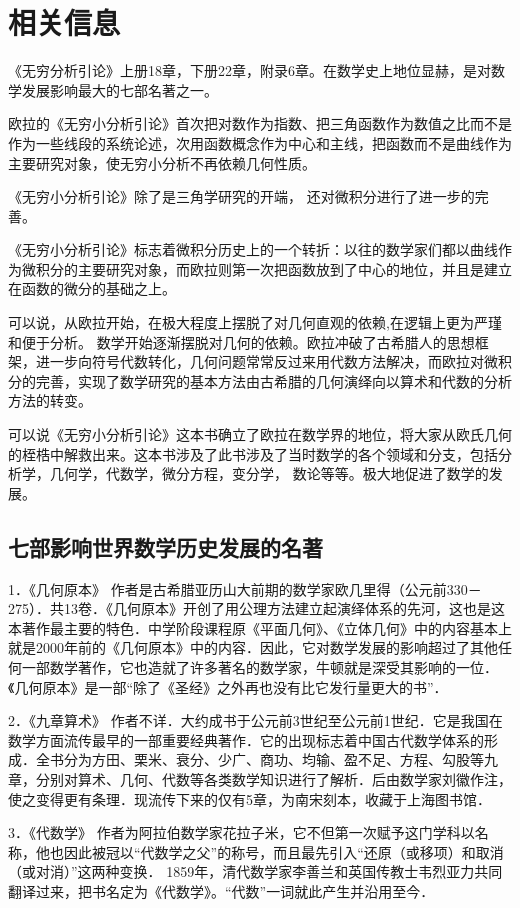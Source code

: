 \chapter*{相关信息}
《无穷分析引论》上册18章，下册22章，附录6章。在数学史上地位显赫，是对数学发展影响最大的七部名著之一。

欧拉的《无穷小分析引论》首次把对数作为指数、把三角函数作为数值之比而不是作为一些线段的系统论述，次用函数概念作为中心和主线，把函数而不是曲线作为主要研究对象，使无穷小分析不再依赖几何性质。

《无穷小分析引论》除了是三角学研究的开端， 还对微积分进行了进一步的完善。

《无穷小分析引论》标志着微积分历史上的一个转折：以往的数学家们都以曲线作为微积分的主要研究对象，而欧拉则第一次把函数放到了中心的地位，并且是建立在函数的微分的基础之上。

可以说，从欧拉开始，在极大程度上摆脱了对几何直观的依赖,在逻辑上更为严瑾和便于分析。 数学开始逐渐摆脱对几何的依赖。欧拉冲破了古希腊人的思想框架，进一步向符号代数转化，几何问题常常反过来用代数方法解决，而欧拉对微积分的完善，实现了数学研究的基本方法由古希腊的几何演绎向以算术和代数的分析方法的转变。

可以说《无穷小分析引论》这本书确立了欧拉在数学界的地位，将大家从欧氏几何的桎梏中解救出来。这本书涉及了此书涉及了当时数学的各个领域和分支，包括分析学，几何学，代数学，微分方程，变分学， 数论等等。极大地促进了数学的发展。

\section*{七部影响世界数学历史发展的名著}

1．《几何原本》 作者是古希腊亚历山大前期的数学家欧几里得（公元前330－275）．共13卷．《几何原本》开创了用公理方法建立起演绎体系的先河，这也是这本著作最主要的特色．中学阶段课程原《平面几何》、《立体几何》中的内容基本上就是2000年前的《几何原本》中的内容．因此，它对数学发展的影响超过了其他任何一部数学著作，它也造就了许多著名的数学家，牛顿就是深受其影响的一位．《几何原本》是一部“除了《圣经》之外再也没有比它发行量更大的书”．

2．《九章算术》 作者不详．大约成书于公元前3世纪至公元前1世纪．它是我国在数学方面流传最早的一部重要经典著作．它的出现标志着中国古代数学体系的形成．全书分为方田、栗米、衰分、少广、商功、均输、盈不足、方程、勾股等九章，分别对算术、几何、代数等各类数学知识进行了解析．后由数学家刘徽作注，使之变得更有条理．现流传下来的仅有5章，为南宋刻本，收藏于上海图书馆．

3．《代数学》 作者为阿拉伯数学家花拉子米，它不但第一次赋予这门学科以名称，他也因此被冠以“代数学之父”的称号，而且最先引入“还原（或移项）和取消（或对消）”这两种变换． 1859年，清代数学家李善兰和英国传教士韦烈亚力共同翻译过来，把书名定为《代数学》。“代数”一词就此产生并沿用至今．

